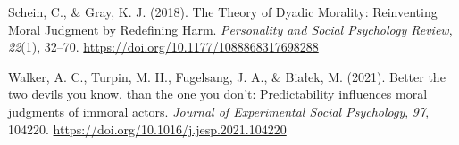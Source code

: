 \documentclass[
  english,
  man,floatsintext]{apa7}
\begin{document}
\leavevmode\hypertarget{ref-schein_theory_2018}{}%
Schein, C., \& Gray, K. J. (2018). The Theory of Dyadic Morality: Reinventing Moral Judgment by Redefining Harm. \emph{Personality and Social Psychology Review}, \emph{22}(1), 32--70. \url{https://doi.org/10.1177/1088868317698288}

\leavevmode\hypertarget{ref-walker_better_2021}{}%
Walker, A. C., Turpin, M. H., Fugelsang, J. A., \& Białek, M. (2021). Better the two devils you know, than the one you don't: Predictability influences moral judgments of immoral actors. \emph{Journal of Experimental Social Psychology}, \emph{97}, 104220. \url{https://doi.org/10.1016/j.jesp.2021.104220}
\end{document}
